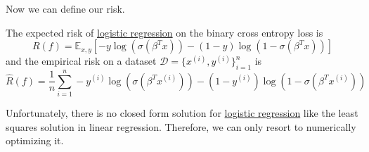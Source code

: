   Now we can define our risk. 

  \begin{theorem}[Risk]
    \label{thm:risk}
    The expected risk of \hyperref[def:logistic-regression]{logistic regression} on the binary cross entropy loss is 
    \begin{equation}
      R(f) = \mathbb{E}_{x, y} \left[ -y \log(\sigma(\beta^T x)) - (1 - y) \log(1 - \sigma(\beta^T x)) \right]
    \end{equation} 
    and the empirical risk on a dataset $\mathcal{D} = \{x^{(i)}, y^{(i)}\}_{i=1}^n$ is 
    \begin{equation}
      \hat{R}(f) = \frac{1}{n} \sum_{i=1}^n -y^{(i)} \log(\sigma(\beta^T x^{(i)})) - (1 - y^{(i)}) \log(1 - \sigma(\beta^T x^{(i)}))
    \end{equation}
  \end{theorem}

  Unfortunately, there is no closed form solution for \hyperref[def:logistic-regression]{logistic regression} like the least squares solution in linear regression. Therefore, we can only resort to numerically optimizing it. 

    \label{thm:gradients-of-empirical-risk}

